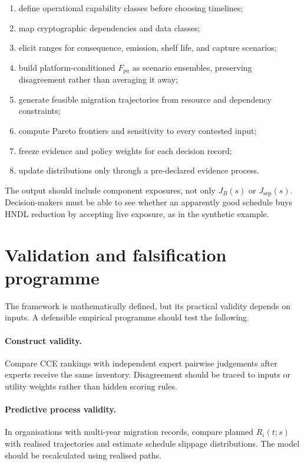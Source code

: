 \documentclass[10pt]{article}
\begin{document}
\begin{enumerate}
\item define operational capability classes before choosing timelines;
\item map cryptographic dependencies and data classes;
\item elicit ranges for consequence, emission, shelf life, and capture scenarios;
\item build platform-conditioned $F_{pa}$ as scenario ensembles, preserving disagreement rather than averaging it away;
\item generate feasible migration trajectories from resource and dependency constraints;
\item compute Pareto frontiers and sensitivity to every contested input;
\item freeze evidence and policy weights for each decision record;
\item update distributions only through a pre-declared evidence process.
\end{enumerate}

The output should include component exposures, not only $J_B(s)$ or $J_{\mathrm{sep}}(s)$. Decision-makers must be able to see whether an apparently good schedule buys HNDL reduction by accepting live exposure, as in the synthetic example.

\section{Validation and falsification programme}

The framework is mathematically defined, but its practical validity depends on inputs. A defensible empirical programme should test the following.

\paragraph{Construct validity.} Compare CCE rankings with independent expert pairwise judgements after experts receive the same inventory. Disagreement should be traced to inputs or utility weights rather than hidden scoring rules.

\paragraph{Predictive process validity.} In organisations with multi-year migration records, compare planned $R_i(t;s)$ with realised trajectories and estimate schedule slippage distributions. The model should be recalculated using realised paths.
\end{document}
